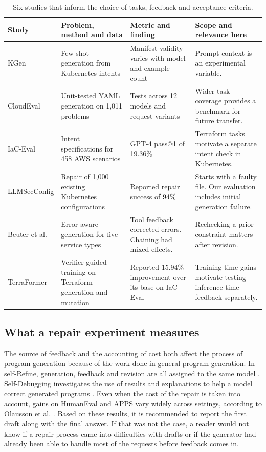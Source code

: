 \documentclass[12pt,onecolumn,draftclsnofoot]{IEEEtran}
\begin{document}
\begin{table}[htbp]\centering
\caption{Six studies that inform the choice of tasks, feedback and acceptance criteria.}
\label{tab:work}\small
\begin{tabular}{@{}p{.16\linewidth}p{.25\linewidth}p{.24\linewidth}p{.26\linewidth}@{}}
\toprule Study & Problem, method and data & Metric and finding & Scope and relevance here\\\midrule
KGen \cite{kgen} & Few-shot generation from Kubernetes intents & Manifest validity varies with model and example count & Prompt context is an experimental variable.\\
CloudEval \cite{cloud} & Unit-tested YAML generation on 1,011 problems & Tests across 12 models and request variants & Wider task coverage provides a benchmark for future transfer.\\
IaC-Eval \cite{iac} & Intent specifications for 458 AWS scenarios & GPT-4 pass@1 of 19.36\% & Terraform tasks motivate a separate intent check in Kubernetes.\\
LLMSecConfig \cite{sec} & Repair of 1,000 existing Kubernetes configurations & Reported repair success of 94\% & Starts with a faulty file. Our evaluation includes initial generation failure.\\
Beuter et al.\ \cite{beuter} & Error-aware generation for five service types & Tool feedback corrected errors. Chaining had mixed effects. & Rechecking a prior constraint matters after revision.\\
TerraFormer \cite{terra} & Verifier-guided training on Terraform generation and mutation & Reported 15.94\% improvement over its base on IaC-Eval & Training-time gains motivate testing inference-time feedback separately.\\
\bottomrule\end{tabular}
\end{table}

\subsection{What a repair experiment measures}
The source of feedback and the accounting of cost both affect the process of program generation because of the work done in general program generation. In self-Refine, generation, feedback and revision are all assigned to the same model \cite{refine}. Self-Debugging investigates the use of results and explanations to help a model correct generated programs \cite{debug}. Even when the cost of the repair is taken into account, gains on HumanEval and APPS vary widely across settings, according to Olausson et al. \cite{budget}. Based on these results, it is recommended to report the first draft along with the final answer. If that was not the case, a reader would not know if a repair process came into difficulties with drafts or if the generator had already been able to handle most of the requests before feedback comes in.
\end{document}
